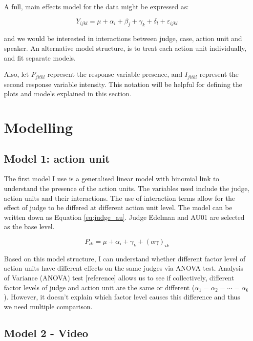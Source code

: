 \documentclass{monashthesis}
\begin{document}
A full, main effects model for the data might be expressed as:

\[Y_{ijkl} = \mu + \alpha_i + \beta_j + \gamma_k + \delta_l + \varepsilon_{ijkl}\]

\noindent and we would be interested in interactions between judge, case, action unit and speaker. An alternative model structure, is to treat each action unit individually, and fit separate models.

Also, let \(P_{jitkl}\) represent the response variable presence, and \(I_{jitkl}\) represent the second response variable intensity. This notation will be helpful for defining the plots and models explained in this section.

\hypertarget{modelling}{%
\section{Modelling}\label{modelling}}

\hypertarget{model-1-action-unit}{%
\subsection{Model 1: action unit}\label{model-1-action-unit}}

The first model I use is a generalised linear model with binomial link to understand the presence of the action units. The variables used include the judge, action units and their interactions. The use of interaction terms allow for the effect of judge to be differed at different action unit level. The model can be written down as Equation \ref{eq:judge_au}. Judge Edelman and AU01 are selected as the base level.

\begin{equation}\label{eq:judge_au}
P_{ik} = \mu + \alpha_i + \gamma_k + (\alpha\gamma)_{ik}
\end{equation}

Based on this model structure, I can understand whether different factor level of action units have different effects on the same judges via ANOVA test. Analysis of Variance (ANOVA) test {[}reference{]} allows us to see if collectively, different factor levels of judge and action unit are the same or different (\(\alpha_1 = \alpha_2 = \cdots = \alpha_6\)). However, it doesn't explain which factor level causes this difference and thus we need multiple comparison.

\hypertarget{model-2---video}{%
\subsection{Model 2 - Video}\label{model-2---video}}
\end{document}

